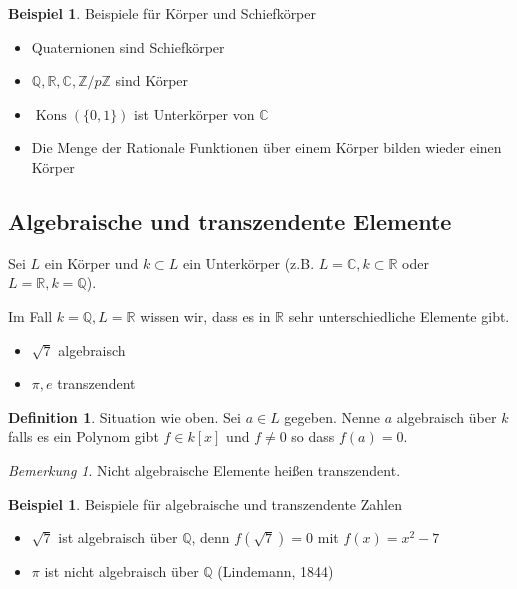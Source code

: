 \documentclass[12pt,parskip=full]{scrartcl}
\newcommand{\setZ}{\mathbb{Z}}
\newcommand{\setQ}{\mathbb{Q}}
\newcommand{\setR}{\mathbb{R}}
\newcommand{\setC}{\mathbb{C}}
\DeclareMathOperator{\Kons}{Kons}
\theoremstyle{definition}
\newtheorem{definition}[theorem]{Definition}
\newtheorem{example}[theorem]{Beispiel}
\theoremstyle{remark}
\newtheorem*{remark}{Bemerkung}
\begin{document}
	\begin{example}
		Beispiele für Körper und Schiefkörper
		\begin{itemize}
			\item Quaternionen sind Schiefkörper
			\item $\setQ, \setR, \setC, \setZ / p \setZ$ sind Körper
			\item $\Kons(\{ 0 , 1 \})$ ist Unterkörper von $\setC$
			\item Die Menge der Rationale Funktionen über einem Körper bilden wieder einen Körper
		\end{itemize}
	\end{example}

	\subsection{Algebraische und transzendente Elemente}
	
	Sei $L$ ein Körper und $k \subset L$ ein Unterkörper (z.B. $L = \setC, k \subset \setR$ oder $L = \setR, k = \setQ$).
	
	Im Fall $k = \setQ, L = \setR$ wissen wir, dass es in $\setR$ sehr unterschiedliche Elemente gibt.
	
	\begin{itemize}
		\item $\sqrt{7}$ \textellipsis algebraisch
		\item $\pi, e$ \textellipsis transzendent
	\end{itemize}

	\begin{definition}
		Situation wie oben. Sei $a \in L$ gegeben. Nenne $a$ algebraisch über $k$ falls es ein Polynom gibt $f \in k[x]$ und $f \neq 0$ so dass $f(a) = 0$.
	\end{definition}

	\begin{remark}
		Nicht algebraische Elemente heißen transzendent.
	\end{remark}

	\begin{example}
		Beispiele für algebraische und transzendente Zahlen
		\begin{itemize}
			\item $\sqrt{7}$ ist algebraisch über $\setQ$, denn $f(\sqrt{7}) = 0$ mit $f(x) = x^2 - 7$
			\item $\pi$ ist nicht algebraisch über $\setQ$ (Lindemann, 1844)
		\end{itemize}
	\end{example}
\end{document}

